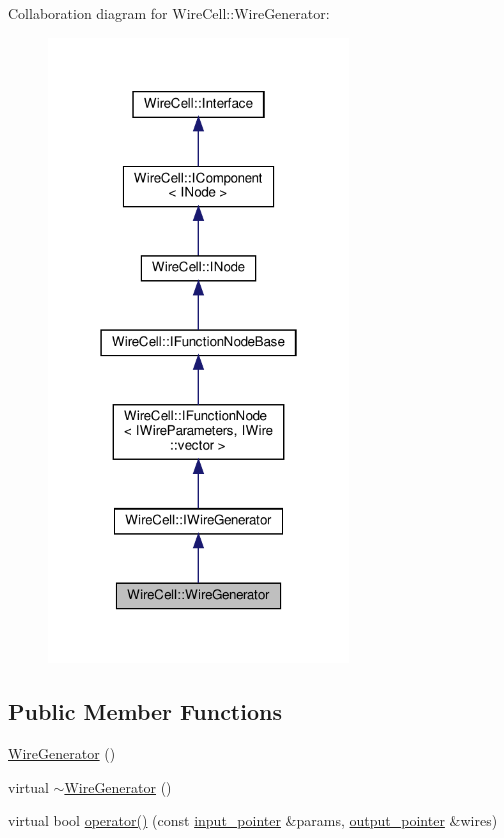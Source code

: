 Collaboration diagram for Wire\+Cell\+:\+:Wire\+Generator\+:
\nopagebreak
\begin{figure}[H]
\begin{center}
\leavevmode
\includegraphics[width=226pt]{class_wire_cell_1_1_wire_generator__coll__graph}
\end{center}
\end{figure}
\subsection*{Public Member Functions}
\begin{DoxyCompactItemize}
\item 
\hyperlink{class_wire_cell_1_1_wire_generator_a935d3aa39c564e878d6011de6f4cfd42}{Wire\+Generator} ()
\item 
virtual \hyperlink{class_wire_cell_1_1_wire_generator_a907e310d6f77cf3a9da23cbc39a4d40f}{$\sim$\+Wire\+Generator} ()
\item 
virtual bool \hyperlink{class_wire_cell_1_1_wire_generator_a2a71acbc33a0b0f6ec1bd6944359a86f}{operator()} (const \hyperlink{class_wire_cell_1_1_i_function_node_a55c0946156df9b712b8ad1a0b59b2db6}{input\+\_\+pointer} \&params, \hyperlink{class_wire_cell_1_1_i_function_node_afc02f1ec60d31aacddf64963f9ca650b}{output\+\_\+pointer} \&wires)
\end{DoxyCompactItemize}
